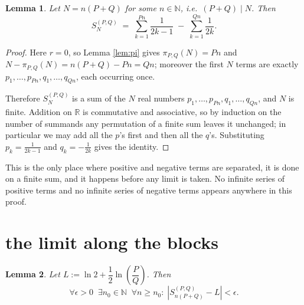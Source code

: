 \documentclass[11pt]{article}
\newtheorem{lemma}{Lemma}
\begin{document}
\begin{lemma}\label{lem:split}
Let $N = n(P+Q)$ for some $n \in \mathbb{N}$, i.e.\ $(P+Q) \mid N$. Then
\[
S_N^{(P,Q)} \;=\; \sum_{k=1}^{Pn} \frac{1}{2k-1} \;-\; \sum_{k=1}^{Qn} \frac{1}{2k}.
\]
\end{lemma}

\begin{proof}
Here $r = 0$, so Lemma \ref{lem:pi} gives $\pi_{P,Q}(N) = Pn$ and
$N - \pi_{P,Q}(N) = n(P+Q) - Pn = Qn$; moreover the first $N$ terms are exactly
$p_1, \dots, p_{Pn}, q_1, \dots, q_{Qn}$, each occurring once.

Therefore $S_N^{(P,Q)}$ is a sum of the $N$ real numbers
$p_1,\dots,p_{Pn},q_1,\dots,q_{Qn}$, and $N$ is finite. Addition on $\mathbb{R}$ is
commutative and associative, so by induction on the number of summands any permutation of
a finite sum leaves it unchanged; in particular we may add all the $p$'s first and then
all the $q$'s. Substituting $p_k = \frac{1}{2k-1}$ and $q_k = -\frac{1}{2k}$ gives the
identity.
\end{proof}

This is the only place where positive and negative terms are separated, it is done on a
finite sum, and it happens before any limit is taken. No infinite series of positive terms
and no infinite series of negative terms appears anywhere in this proof.

\section{the limit along the blocks}

\begin{lemma}\label{lem:blocklimit}
Let $L := \ln 2 + \dfrac{1}{2}\ln\!\left(\dfrac{P}{Q}\right)$. Then
\[
\forall \epsilon > 0 \;\; \exists n_0 \in \mathbb{N} \;\; \forall n \ge n_0 : \;
\left| S_{n(P+Q)}^{(P,Q)} - L \right| < \epsilon .
\]
\end{lemma}
\end{document}
